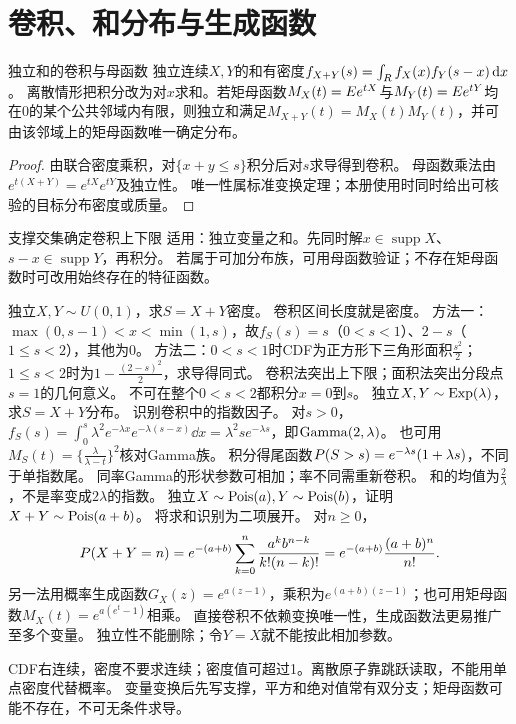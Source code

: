 \section{卷积、和分布与生成函数}\label{sec:25}
\begin{theorem}{独立和的卷积与母函数}
独立连续$X,Y$的和有密度$f_{X+Y}(s)=\int_{R}f_X(x)f_Y(s-x)\,\mathrm d x$。
离散情形把积分改为对$x$求和。若矩母函数$M_X(t)=E e^{tX}$与$M_Y(t)=E e^{tY}$均在0的某个公共邻域内有限，则独立和满足$M_{X+Y}(t)=M_X(t)M_Y(t)$，并可由该邻域上的矩母函数唯一确定分布。
\end{theorem}
\begin{proof}
由联合密度乘积，对$\{x+y\le s\}$积分后对$s$求导得到卷积。
母函数乘法由$e^{t(X+Y)}=e^{tX}e^{tY}$及独立性。
唯一性属标准变换定理；本册使用时同时给出可核验的目标分布密度或质量。
\end{proof}
\begin{method}{支撑交集确定卷积上下限}
适用：独立变量之和。先同时解$x\in\operatorname{supp}X$、$s-x\in\operatorname{supp}Y$，再积分。
若属于可加分布族，可用母函数验证；不存在矩母函数时可改用始终存在的特征函数。
\end{method}
{独立$X,Y\sim U(0,1)$，求$S=X+Y$密度。}
{卷积区间长度就是密度。}
{方法一：$\max(0,s-1)<x<\min(1,s)$，故$f_S(s)=s$（$0<s<1$）、$2-s$（$1\le s<2$），其他为0。
方法二：$0<s<1$时CDF为正方形下三角形面积$\frac{s^2}{2}$；$1\le s<2$时为$1-\frac{(2-s)^2}{2}$，求导得同式。}
{卷积法突出上下限；面积法突出分段点$s=1$的几何意义。}
{不可在整个$0<s<2$都积分$x=0$到$s$。}
{独立$X,Y\sim\operatorname{Exp}(\lambda)$，求$S=X+Y$分布。}
{识别卷积中的指数因子。}
{对$s>0$，$f_S(s)=\int_0^s\lambda^2e^{-\lambda x}e^{-\lambda(s-x)}\dd x=\lambda^2se^{-\lambda s}$，即$\operatorname{Gamma}(2,\lambda)$。
也可用$M_S(t)=\{\frac{\lambda}{\lambda-t}\}^2$核对Gamma族。
积分得尾函数$P(S>s)=e^{-\lambda s}(1+\lambda s)$，不同于单指数尾。}
{同率Gamma的形状参数可相加；率不同需重新卷积。}
{和的均值为$\frac{2}{\lambda}$，不是率变成$2\lambda$的指数。}
{独立$X\sim\operatorname{Pois}(a),Y\sim\operatorname{Pois}(b)$，证明$X+Y\sim\operatorname{Pois}(a+b)$。}
{将求和识别为二项展开。}
{对$n\ge0$，
\[P(X+Y=n)=e^{-(a+b)}\sum_{k=0}^n\dfrac{a^kb^{n-k}}{k!(n-k)!}=e^{-(a+b)}\dfrac{(a+b)^n}{n!}.\]
另一法用概率生成函数$G_X(z)=e^{a(z-1)}$，乘积为$e^{(a+b)(z-1)}$；也可用矩母函数$M_X(t)=e^{a(e^t-1)}$相乘。}
{直接卷积不依赖变换唯一性，生成函数法更易推广至多个变量。}
{独立性不能删除；令$Y=X$就不能按此相加参数。}
\begin{warning}
CDF右连续，密度不要求连续；密度值可超过1。离散原子靠跳跃读取，不能用单点密度代替概率。
变量变换后先写支撑，平方和绝对值常有双分支；矩母函数可能不存在，不可无条件求导。
\end{warning}


